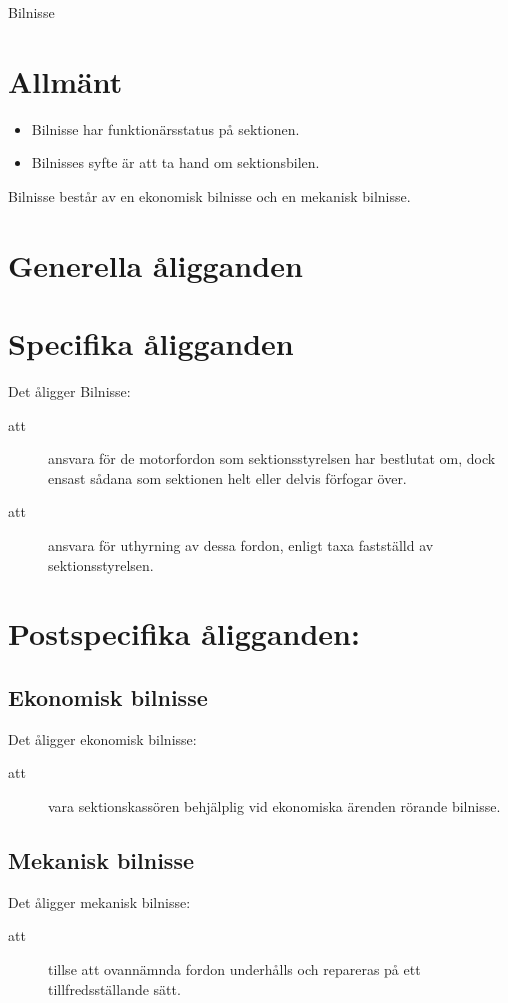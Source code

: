 \documentclass[a4paper]{article}
\begin{document}
\renewcommand{\forening}{Bilnisse} %

\begin{foreningenv}{\forening{}} %
    \section{Allmänt}
    \begin{itemize}
        \item Bilnisse har funktionärsstatus på sektionen.
        \item Bilnisses syfte är att ta hand om sektionsbilen.
    \end{itemize}
    Bilnisse består av en ekonomisk bilnisse och en mekanisk bilnisse.
    
    \section{Generella åligganden}
    \aliggsektfunkt{} %
        
    \section{Specifika åligganden}
    Det åligger \forening{}:
    \begin{description}
          \item[att] ansvara för de motorfordon som sektionsstyrelsen har bestlutat om, dock ensast sådana som sektionen helt eller delvis förfogar över.
          \item[att] ansvara för uthyrning av dessa fordon, enligt taxa fastställd av sektionsstyrelsen.
    \end{description}
    
    \section{Postspecifika åligganden:}
    \subsection{Ekonomisk bilnisse}
    Det åligger ekonomisk bilnisse:
    \begin{description}
          \item[att] vara sektionskassören behjälplig vid ekonomiska ärenden rörande bilnisse. 
    \end{description}
    
    \subsection{Mekanisk bilnisse}
    Det åligger mekanisk bilnisse:
    \begin{description}
          \item[att] tillse att ovannämnda fordon underhålls och repareras på ett tillfredsställande sätt.
    \end{description}
\end{foreningenv}
\end{document}
